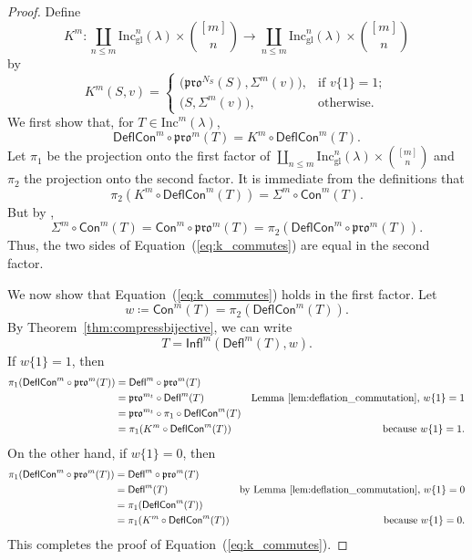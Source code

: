 \documentclass[12pt]{amsart}
\theoremstyle{definition}
\theoremstyle{remark}
\numberwithin{equation}{section}
\newcommand{\inc}{\ensuremath{\mathrm{Inc}}}
\newcommand{\incgl}{\inc_{\mathrm{gl}}}
\newcommand{\pro}{\mathfrak{pro}}
\newcommand{\deflate}{\ensuremath{\mathsf{Defl}}}
\newcommand{\tinflate}{\ensuremath{\mathsf{Infl}}}
\newcommand{\content}{\ensuremath{\mathsf{Con}}}
\newcommand{\compress}{\ensuremath{\mathsf{DeflCon}}}
\begin{document}
  \begin{proof}
Define
  \[
  K^m: \coprod_{n \leq m}\incgl^n(\lambda) \times \binom{[m]}{n} \rightarrow \coprod_{n \leq m}\incgl^n(\lambda) \times \binom{[m]}{n}
  \] by
\[
K^m(S,v) =
\begin{cases}
    \big( \pro^{N_S}(S),\Sigma^m(v) \big),  & \text{if } v\{1\} = 1; \\        
   \big( S,\Sigma^m(v) \big), & \text{otherwise.}
\end{cases}
\]
We first show that, for $T \in \inc^m(\lambda)$,
\begin{equation}\label{eq:k_commutes}
\compress^m \circ \pro^m(T) = K^m \circ \compress^m(T).
\end{equation}
Let $\pi_1$ be the projection onto the first factor of $\coprod_{n \leq m}\incgl^n(\lambda) \times \binom{[m]}{n}$ and $\pi_2$ the projection onto the second factor. It is immediate from the definitions that \[ \pi_2(K^m \circ \compress^m(T)) = \Sigma^m \circ \content^m(T).\] But by \cite[Lemma~2.1]{DPS},
\[  \Sigma^m \circ \content^m(T) = \content^m \circ \pro^m(T) = \pi_2(\compress^m \circ \pro^m(T)).\] Thus, the two sides of Equation~(\ref{eq:k_commutes}) are equal in the second factor.  

We now show that Equation~(\ref{eq:k_commutes}) holds in the first factor. Let \[ w \coloneqq \content^m(T) = \pi_2(\compress^m(T)). \]  By Theorem~\ref{thm:compressbijective}, we can write
\[ T = \tinflate^m(\deflate^m(T), w).\] 
If $w\lbrace 1 \rbrace = 1 $, then
\begin{align*}
\pi_1(\compress^m \circ \pro^m(T)) &= \deflate^m \circ \pro^m(T) \\
&= \pro^{m_t} \circ \deflate^m (T) &\text{Lemma~\ref{lem:deflation_commutation}, $w\lbrace 1 \rbrace = 1$} \\
&= \pro^{m_t} \circ \pi_1 \circ \compress^m(T) \\ 
&= \pi_1(K^m \circ \compress^m(T)) &\text{because $w\lbrace 1 \rbrace = 1$.}
\end{align*}
On the other hand, if $w \lbrace 1 \rbrace = 0$, then 
\begin{align*}
\pi_1(\compress^m \circ \pro^m(T)) &= \deflate^m \circ \pro^m(T) \\
&= \deflate^m(T) &\text{by Lemma~\ref{lem:deflation_commutation}, $w \lbrace 1 \rbrace = 0$} \\
&= \pi_1 ( \compress^m(T) ) \\
&= \pi_1 ( K^m \circ \compress^m(T)) &\text{because $w\lbrace 1 \rbrace = 0$.}
\end{align*}
This completes the proof of Equation~(\ref{eq:k_commutes}).


\end{proof}
\end{document}
